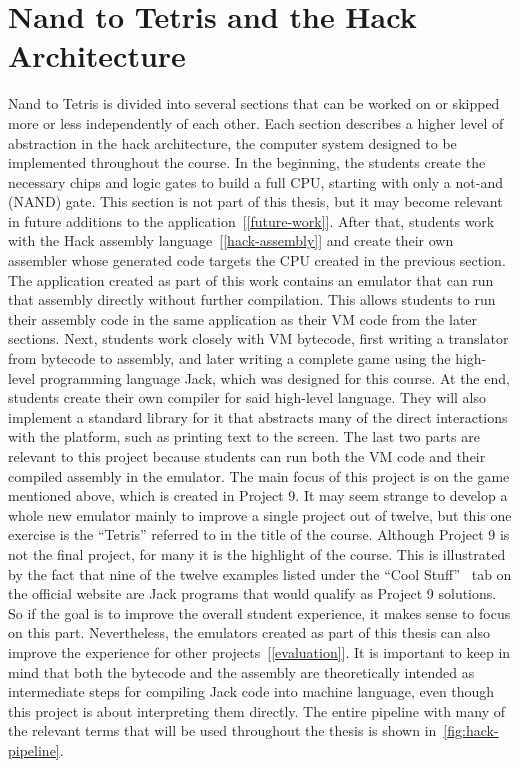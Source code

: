 \section{Nand to Tetris and the Hack Architecture} \label{hack-architecture}
Nand to Tetris is divided into several sections that can be worked on or skipped more or less independently of each other.
Each section describes a higher level of abstraction in the hack architecture, the computer system designed to be implemented throughout the course.
In the beginning, the students create the necessary chips and logic gates to build a full CPU, starting with only a not-and (NAND) gate.
This section is not part of this thesis, but it may become relevant in future additions to the application~[\ref{future-work}].
After that, students work with the Hack assembly language~[\ref{hack-assembly}] and create their own assembler whose generated code targets the CPU created in the previous section.
The application created as part of this work contains an emulator that can run that assembly directly without further compilation.
This allows students to run their assembly code in the same application as their VM code from the later sections.
Next, students work closely with VM bytecode, first writing a translator from bytecode to assembly, and later writing a complete game using the high-level programming language Jack, which was designed for this course.
At the end, students create their own compiler for said high-level language.
They will also implement a standard library for it that abstracts many of the direct interactions with the platform, such as printing text to the screen.
The last two parts are relevant to this project because students can run both the VM code and their compiled assembly in the emulator.
The main focus of this project is on the game mentioned above, which is created in Project 9.
It may seem strange to develop a whole new emulator mainly to improve a single project out of twelve, but this one exercise is the ``Tetris'' referred to in the title of the course.
Although Project 9 is not the final project, for many it is the highlight of the course.
This is illustrated by the fact that nine of the twelve examples listed under the ``Cool Stuff''~\cite{n2tweb} tab on the official website are Jack programs that would qualify as Project 9 solutions.
So if the goal is to improve the overall student experience, it makes sense to focus on this part.
Nevertheless, the emulators created as part of this thesis can also improve the experience for other projects~[\ref{evaluation}].
It is important to keep in mind that both the bytecode and the assembly are theoretically intended as intermediate steps for compiling Jack code into machine language, even though this project is about interpreting them directly.
The entire pipeline with many of the relevant terms that will be used throughout the thesis is shown in~\cref{fig:hack-pipeline}.


